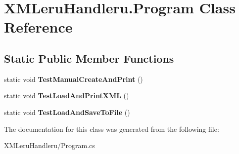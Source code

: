 \hypertarget{class_x_m_leru_handleru_1_1_program}{}\section{X\+M\+Leru\+Handleru.\+Program Class Reference}
\label{class_x_m_leru_handleru_1_1_program}
\subsection*{Static Public Member Functions}
\begin{DoxyCompactItemize}
\item 
\hypertarget{class_x_m_leru_handleru_1_1_program_a1fac06cc0ab95a39af3c262ae2152739}{}static void {\bfseries Test\+Manual\+Create\+And\+Print} ()\label{class_x_m_leru_handleru_1_1_program_a1fac06cc0ab95a39af3c262ae2152739}

\item 
\hypertarget{class_x_m_leru_handleru_1_1_program_a46277b5cc2e1f90abc6072dbf7b3bd28}{}static void {\bfseries Test\+Load\+And\+Print\+X\+M\+L} ()\label{class_x_m_leru_handleru_1_1_program_a46277b5cc2e1f90abc6072dbf7b3bd28}

\item 
\hypertarget{class_x_m_leru_handleru_1_1_program_a928ffe04f368b42de64fd208a2b2548d}{}static void {\bfseries Test\+Load\+And\+Save\+To\+File} ()\label{class_x_m_leru_handleru_1_1_program_a928ffe04f368b42de64fd208a2b2548d}

\end{DoxyCompactItemize}


The documentation for this class was generated from the following file\+:\begin{DoxyCompactItemize}
\item 
X\+M\+Leru\+Handleru/Program.\+cs\end{DoxyCompactItemize}
